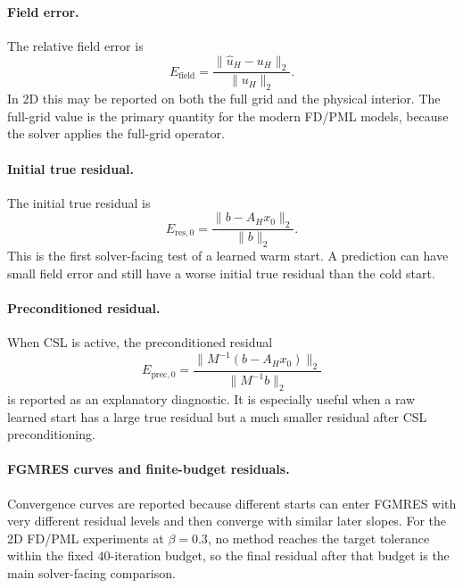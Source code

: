 \paragraph{Field error.}
The relative field error is
\begin{equation}
    E_{\mathrm{field}}
    =
    \frac{\|\hat{u}_H-u_H\|_2}{\|u_H\|_2}.
    \label{eq:setup-field-error}
\end{equation}
In 2D this may be reported on both the full grid and the physical interior.
The full-grid value is the primary quantity for the modern FD/PML models,
because the solver applies the full-grid operator.

\paragraph{Initial true residual.}
The initial true residual is
\begin{equation}
    E_{\mathrm{res},0}
    =
    \frac{\|b-A_Hx_0\|_2}{\|b\|_2}.
    \label{eq:setup-initial-true-residual}
\end{equation}
This is the first solver-facing test of a learned warm start. A prediction can
have small field error and still have a worse initial true residual than the
cold start.

\paragraph{Preconditioned residual.}
When CSL is active, the preconditioned residual
\begin{equation}
    E_{\mathrm{prec},0}
    =
    \frac{\|M^{-1}(b-A_Hx_0)\|_2}{\|M^{-1}b\|_2}
    \label{eq:setup-initial-preconditioned-residual}
\end{equation}
is reported as an explanatory diagnostic. It is especially useful when a raw
learned start has a large true residual but a much smaller residual after CSL
preconditioning.

\paragraph{FGMRES curves and finite-budget residuals.}
Convergence curves are reported because different starts can enter FGMRES
with very different residual levels and then converge with similar later
slopes. For the 2D FD/PML experiments at $\beta=0.3$, no method reaches the
target tolerance within the fixed $40$-iteration budget, so the final residual
after that budget is the main solver-facing comparison.

